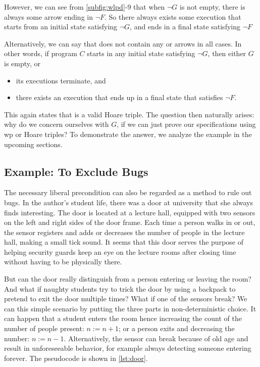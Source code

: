 However, we can see from \autoref{subfig:wlpd}{\color{RoyalBlue}-9} that when $\neg G$ is not empty, there is always some arrow ending in $\neg F$. 
So there always exists some execution that starts from an initial state satisfying $\neg G$, and ends in a final state satisfying $\neg F$%

Alternatively, we can say that does not contain any  or  arrows in all cases. 
In other words, if program $C$ starts in any initial state satisfying $\neg G$, then either $G$ is empty, or
\begin{itemize}
	\item its executions terminate, and
	\item there exists an execution that ends up in a final state that satisfies $\neg F$. 
\end{itemize}

This again states that  is a valid Hoare triple. 
The question then naturally arises: why do we concern ourselves with $G$, if we can just prove our specifications using wp or Hoare triples? 
To demonstrate the answer, we analyze the example in the upcoming sections. 


\subsection{Example: To Exclude Bugs}
The necessary liberal precondition can also be regarded as a method to rule out bugs. 
In the author's student life, there was a door at university that she always finds interesting. 
The door is located at a lecture hall, equipped with two sensors on the left and right sides of the door frame. 
Each time a person walks in or out, the sensor registers and adds or decreases the number of people in the lecture hall, making a small tick sound. 
It seems that this door serves the purpose of helping security guards keep an eye on the lecture rooms after closing time without having to be physically there. 

But can the door really distinguish from a person entering or leaving the room? 
And what if naughty students try to trick the door by using a backpack to pretend to exit the door multiple times? 
What if one of the sensors break? 
We can this simple scenario by putting the three parts in non-deterministic choice. 
It can happen that a student enters the room hence increasing the count of the number of people present: $n:=n+1$; or a person exits and decreasing the number: $n:=n-1$. 
Alternatively, the sensor can break because of old age and result in unforeseeable behavior, for example always detecting someone entering forever. 
The pseudocode is shown in \autoref{lst:door}. 

